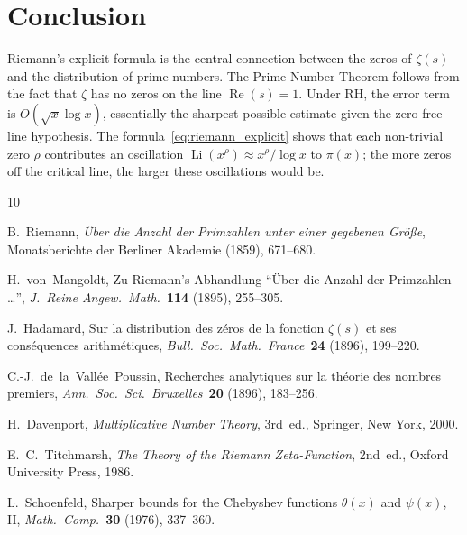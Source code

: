 \documentclass[12pt,a4paper]{amsart}
\theoremstyle{definition}
\DeclareMathOperator{\Re}{Re}
\DeclareMathOperator{\Li}{Li}
\begin{document}
\section{Conclusion}

Riemann's explicit formula is the central connection between the zeros
of $\zeta(s)$ and the distribution of prime numbers.
The Prime Number Theorem follows from the fact that $\zeta$ has no zeros
on the line $\Re(s) = 1$.
Under RH, the error term is $O(\sqrt{x}\log x)$,
essentially the sharpest possible estimate given the zero-free line hypothesis.
The formula~\eqref{eq:riemann_explicit} shows that each non-trivial zero
$\rho$ contributes an oscillation $\Li(x^\rho) \approx x^\rho/\log x$
to $\pi(x)$; the more zeros off the critical line, the larger these
oscillations would be.

\begin{thebibliography}{10}

B.~Riemann,
\emph{\"Uber die Anzahl der Primzahlen unter einer gegebenen Gr\"o\ss e},
Monatsberichte der Berliner Akademie (1859), 671--680.

H.~von~Mangoldt,
Zu Riemann's Abhandlung ``\"Uber die Anzahl der Primzahlen \ldots'',
\emph{J.\ Reine Angew.\ Math.}\ \textbf{114} (1895), 255--305.

J.~Hadamard,
Sur la distribution des z\'eros de la fonction $\zeta(s)$ et ses
cons\'equences arithm\'etiques,
\emph{Bull.\ Soc.\ Math.\ France}\ \textbf{24} (1896), 199--220.

C.-J.\ de~la~Vall\'ee~Poussin,
Recherches analytiques sur la th\'eorie des nombres premiers,
\emph{Ann.\ Soc.\ Sci.\ Bruxelles}\ \textbf{20} (1896), 183--256.

H.~Davenport,
\emph{Multiplicative Number Theory}, 3rd~ed.,
Springer, New York, 2000.

E.~C.~Titchmarsh,
\emph{The Theory of the Riemann Zeta-Function}, 2nd~ed.,
Oxford University Press, 1986.

L.~Schoenfeld,
Sharper bounds for the Chebyshev functions $\theta(x)$ and $\psi(x)$, II,
\emph{Math.\ Comp.}\ \textbf{30} (1976), 337--360.

\end{thebibliography}
\end{document}
